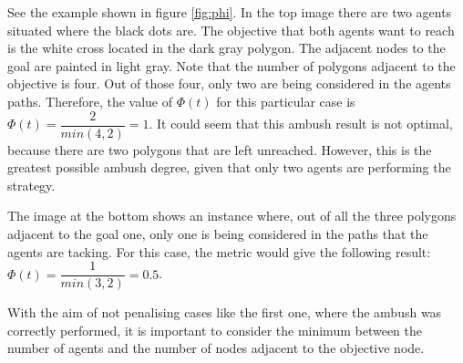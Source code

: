 See the example shown in figure \ref{fig:phi}. In the top image 
there are two agents situated where the black dots are. 
The objective that both agents want to reach is the white cross 
located in the dark gray polygon. The adjacent nodes to the goal 
are painted in light gray. Note that the number of polygons adjacent
to the objective is four. Out of those four, only two are being
considered in the agents paths. Therefore, the value of $\Phi(t)$
for this particular case is $\Phi(t) = \dfrac{2}{min(4,2)} = 1$.
It could seem that this ambush result is not optimal,
because there are two polygons that are left unreached.
 However, this is the greatest possible ambush degree, 
 given that only two agents are performing the strategy.

The image at the bottom shows an instance where, 
out of all the three polygons adjacent to the goal one, 
only one is being considered in the paths that the 
agents are tacking. For this case, the metric would
give the following result: $\Phi(t) = \dfrac{1}{min(3,2)} = 0.5$.

With the aim of not penalising cases like the first one, 
where the ambush was correctly performed, it is important
to consider the minimum between the number of agents and
the number of nodes adjacent to the objective node.